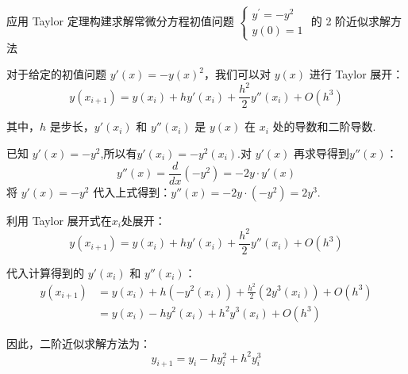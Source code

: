      \begin{tcolorbox}[breakable,enhanced,arc=0mm,outer arc=0mm,
		boxrule=0pt,toprule=1pt,leftrule=0pt,bottomrule=1pt, rightrule=0pt,left=0.2cm,right=0.2cm,
		titlerule=0.5em,toptitle=0.1cm,bottomtitle=-0.1cm,top=0.2cm,
		colframe=white!10!biru,colback=white!90!biru,coltitle=white,
            coltext=black,title =2024-04, title style={white!10!biru}, before skip=8pt, after skip=8pt,before upper=\hspace{2em},
		fonttitle=\bfseries,fontupper=\normalsize]
 应用 Taylor 定理构建求解常微分方程初值问题 $ \left\{\begin{array}{l}y^{\prime}=-y^{2} \\ y(0)=1\end{array}\right. $ 的 2 阶近似求解方法
\tcblower

对于给定的初值问题 $ y'(x) = -y(x)^2 $，我们可以对 $ y(x) $ 进行 Taylor 展开：
$$
y(x_{i+1}) = y(x_i) + hy'(x_i) + \frac{h^2}{2}y''(x_i) + O(h^3)
$$

其中，$ h $ 是步长，$ y'(x_i) $ 和 $ y''(x_i) $ 是 $ y(x) $ 在 $ x_i $ 处的导数和二阶导数.

 已知 $ y'(x) = -y^2 $,所以有$y'(x_i) = -y^2(x_i)$.对 $ y'(x) $ 再求导得到$ y''(x) $：
$$
y''(x) = \frac{d}{dx}(-y^2) = -2y \cdot y'(x)
$$
将 $ y'(x) = -y^2 $ 代入上式得到：$y''(x) = -2y \cdot (-y^2) = 2y^3$.

利用 Taylor 展开式在$x_i$处展开：
$$
y(x_{i+1}) = y(x_i) + hy'(x_i) + \frac{h^2}{2}y''(x_i) + O(h^3)
$$

代入计算得到的 $ y'(x_i) $ 和 $ y''(x_i) $：
$$\begin{aligned}
    y(x_{i+1}) &= y(x_i) + h(-y^2(x_i)) + \frac{h^2}{2}(2y^3(x_i)) + O(h^3)\\&= y(x_i) - hy^2(x_i) + h^2y^3(x_i) + O(h^3)
\end{aligned}
$$

因此，二阶近似求解方法为：
$$
y_{i+1} = y_i - hy_i^2 + h^2y_i^3
$$

  \end{tcolorbox}


